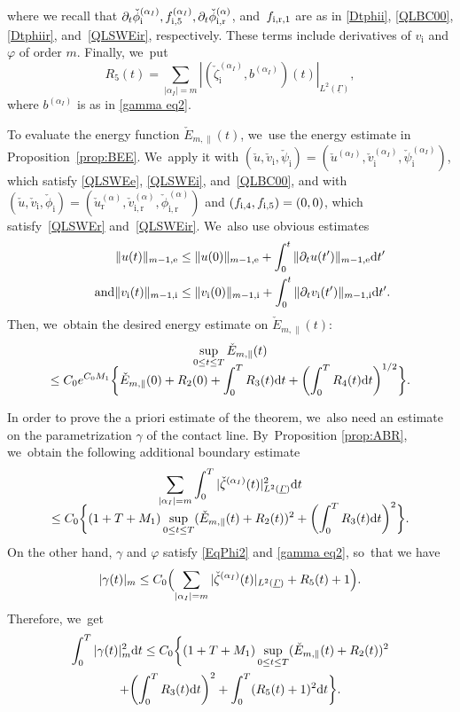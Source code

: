 \documentclass[JEP,XML,SOM,Unicode,NoFloatCountersInSection,published]{cedram}
\newcommand{\dt}{\partial_t}
\newcommand{\ul}[1]{\underline{#1}}
\newcommand{\itGamma}{\mathit{\Gamma}}
\theoremstyle{definition}
\begin{document}
where we recall that $\dt\check{\phi}_\mathrm{i}^{(\alpha_I)},f_{{\rm i},5}^{(\alpha_I)},\dt\check{\phi}_\mathrm{i,r}^{(\alpha)}$,
and~$f_{{\rm i,r},1}$ are as in \eqref{Dtphii}, \eqref{QLBC00}, \eqref{Dtphiir}, and~\eqref{QLSWEir}, respectively.
These terms include derivatives of $v_\mathrm{i}$ and $\varphi$ of order $m$.
Finally, we~put
\[
R_5(t) = \sum_{|\alpha_I|=m} |(\check{\zeta}_\mathrm{i}^{(\alpha_I)},b^{(\alpha_I)})(t)|_{L^2(\ul{\itGamma})},
\]
where $b^{(\alpha_I)}$ is as in \eqref{gamma eq2}.

To evaluate the energy function $\check{E}_{m,\parallel}(t)$, we~use the energy estimate in Proposition~\ref{prop:BEE}. We~apply it with $(\check{u},\check{v}_\mathrm{i},\check{\psi}_\mathrm{i})=(\check{u}^{(\alpha_I)},\check{v}_\mathrm{i}^{(\alpha_I)},\check{\psi}_\mathrm{i}^{(\alpha_I)})$,
which satisfy \eqref{QLSWEe}, \eqref{QLSWEi}, and~\eqref{QLBC00},
and with $(\check{u},\check{v}_\mathrm{i},\check{\phi}_\mathrm{i})=(\check{u}_\mathrm{r}^{(\alpha)},\check{v}_\mathrm{i,r}^{(\alpha)},\check{\phi}_\mathrm{i,r}^{(\alpha)})$
and $(f_{{\rm i},4},f_{{\rm i},5})=(0,0)$, which satisfy~\eqref{QLSWEr} and~\eqref{QLSWEir}. We~also use obvious estimates
\begin{align*}
\|u(t)\|_{m-1,{\rm e}} &\leq \|u(0)\|_{m-1,{\rm e}}+\int_0^t\|\dt u(t')\|_{m-1,{\rm e}}{\rm d}t'\\
\tag*{and}
\|v_\mathrm{i}(t)\|_{m-1,{\rm i}} &\leq \|v_\mathrm{i}(0)\|_{m-1,{\rm i}}+\int_0^t\|\dt v_\mathrm{i}(t')\|_{m-1,{\rm i}}{\rm d}t'.
\end{align*}
Then, we~obtain the desired energy estimate on $\check{E}_{m,\parallel}(t)$:
\begin{multline}\label{NLEE1}
\sup_{0\leq t\leq T}\check{E}_{m,\parallel}(t)\\[-8pt]
\leq C_0 e^{C_0M_1}\biggl\{ \check{E}_{m,\parallel}(0) + R_2(0) + \int_0^TR_3(t){\rm d}t + \biggl(\int_0^TR_4(t){\rm d}t \biggr)^{1/2} \biggr\}.
\end{multline}

In order to prove the a priori estimate of the theorem, we~also need an estimate on the parametrization $\gamma$ of the contact line. By~Proposition \ref{prop:ABR}, we~obtain the following additional boundary estimate
\begin{multline*}
\sum_{|\alpha_I|=m} \int_0^T |\check{\zeta}^{(\alpha_I)}(t)|_{L^2(\ul{\itGamma})}^2 {\rm d}t \\[-8pt]
\leq C_0\biggl\{ (1+T+M_1)\sup_{0\leq t\leq T}(\check{E}_{m,\parallel}(t) + R_2(t))^2 + \biggl(\int_0^TR_3(t){\rm d}t \biggr)^2 \biggr\}.
\end{multline*}
On the other hand, $\gamma$ and $\varphi$ satisfy \eqref{EqPhi2} and \eqref{gamma eq2}, so~that we have
\[
|\gamma(t)|_m \leq C_0\Bigl(\sum_{|\alpha_I|=m}|\check{\zeta}^{(\alpha_I)}(t)|_{L^2(\ul{\itGamma})} + R_5(t) + 1\Bigr).
\]
Therefore, we~get
\begin{multline}\label{NLEE2}
\int_0^T|\gamma(t)|_m^2{\rm d}t
\leq C_0 \biggl\{ (1+T+M_1)\sup_{0\leq t\leq T}(\check{E}_{m,\parallel}(t) + R_2(t))^2 \\
+ \biggl(\int_0^TR_3(t){\rm d}t \biggr)^2 + \int_0^T (R_5(t) + 1)^2{\rm d}t \biggr\}.
\end{multline}
\end{document}
